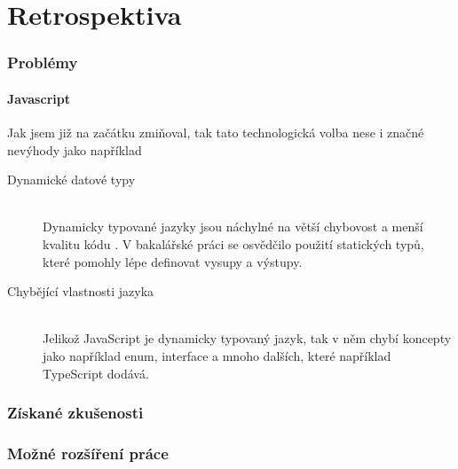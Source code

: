 \chapter{Retrospektiva}
\subsection{Problémy}
\subsubsection{Javascript}
Jak jsem již na začátku zmiňoval, tak tato technologická volba nese i značné nevýhody jako například

\begin{description}
  \item[Dynamické datové typy] \hfill \\ Dynamicky typované jazyky jsou náchylné na větší chybovost a menší kvalitu kódu \cite{pang2018programming}. V bakalářské práci se osvědčilo použití statických typů, které pomohly lépe definovat vysupy a výstupy.
  \item[Chybějící vlastnosti jazyka] \hfill \\ Jelikož JavaScript je dynamicky typovaný jazyk, tak v něm chybí koncepty jako například enum, interface a mnoho dalších, které například TypeScript dodává.
\end{description}

\subsection{Získané zkušenosti}

\subsection{Možné rozšíření práce}